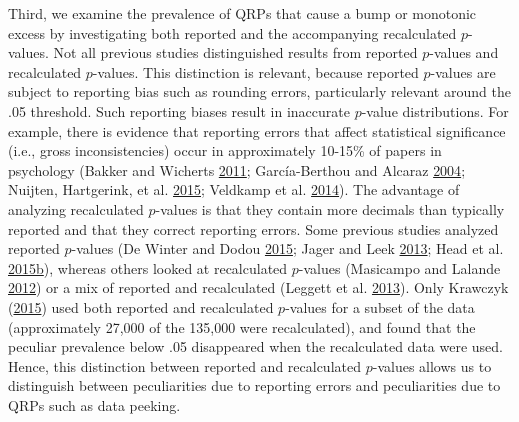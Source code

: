 \documentclass[a5paper]{book}
\begin{document}
Third, we examine the prevalence of QRPs that cause a bump or monotonic
excess by investigating both reported and the accompanying recalculated
\(p\)-values. Not all previous studies distinguished results from
reported \(p\)-values and recalculated \(p\)-values. This distinction is
relevant, because reported \(p\)-values are subject to reporting bias
such as rounding errors, particularly relevant around the .05 threshold.
Such reporting biases result in inaccurate \(p\)-value distributions.
For example, there is evidence that reporting errors that affect
statistical significance (i.e., gross inconsistencies) occur in
approximately 10-15\% of papers in psychology (Bakker and Wicherts
\protect\hyperlink{ref-doi:10.3758ux2fs13428-011-0089-5}{2011};
García-Berthou and Alcaraz
\protect\hyperlink{ref-doi:10.1186ux2f1471-2288-4-13}{2004}; Nuijten,
Hartgerink, et al.
\protect\hyperlink{ref-doi:10.3758ux2fs13428-015-0664-2}{2015}; Veldkamp
et al.
\protect\hyperlink{ref-doi:10.1371ux2fjournal.pone.0114876}{2014}). The
advantage of analyzing recalculated \(p\)-values is that they contain
more decimals than typically reported and that they correct reporting
errors. Some previous studies analyzed reported \(p\)-values (De Winter
and Dodou \protect\hyperlink{ref-doi:10.7717ux2fpeerj.733}{2015}; Jager
and Leek
\protect\hyperlink{ref-doi:10.1093ux2fbiostatisticsux2fkxt007}{2013};
Head et al.
\protect\hyperlink{ref-doi:10.1371ux2fjournal.pbio.1002106}{2015}\protect\hyperlink{ref-doi:10.1371ux2fjournal.pbio.1002106}{b}),
whereas others looked at recalculated \(p\)-values (Masicampo and
Lalande
\protect\hyperlink{ref-doi:10.1080ux2f17470218.2012.711335}{2012}) or a
mix of reported and recalculated (Leggett et al.
\protect\hyperlink{ref-doi:10.1080ux2f17470218.2013.863371}{2013}). Only
Krawczyk
(\protect\hyperlink{ref-doi:10.1371ux2fjournal.pone.0127872}{2015}) used
both reported and recalculated \(p\)-values for a subset of the data
(approximately 27,000 of the 135,000 were recalculated), and found that
the peculiar prevalence below .05 disappeared when the recalculated data
were used. Hence, this distinction between reported and recalculated
\(p\)-values allows us to distinguish between peculiarities due to
reporting errors and peculiarities due to QRPs such as data peeking.
\end{document}

